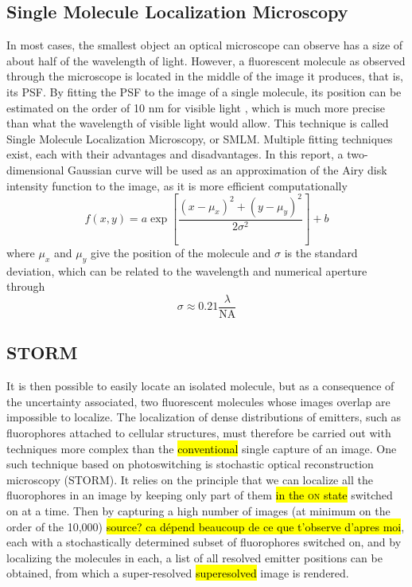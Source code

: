 \subsection{Single Molecule Localization Microscopy} \label{sec:SMLM}
In most cases, the smallest object an optical microscope can observe has a size of about half of the wavelength of light. However, a fluorescent molecule as observed through the microscope is located in the middle of the image it produces, that is, its PSF. By fitting the PSF to the image of a single molecule, its position can be estimated on the order of 10 nm for visible light \cite{douglass_notice_2023}, which is much more precise than what the wavelength of visible light would allow. This technique is called Single Molecule Localization Microscopy, or SMLM. Multiple fitting techniques exist, each with their advantages and disadvantages. In this report, a two-dimensional Gaussian curve will be used as an approximation of the Airy disk intensity function to the image, as it is more efficient \mbox{computationally \cite{douglass_notice_2023}}
\begin{equation}
    f(x, y) = a \exp \left[ \frac{(x-\mu_x)^2 + (y-\mu_y)^2}{2 \sigma^2} \right] + b
\end{equation}
where $\mu_x$ and $\mu_y$ give the position of the molecule and $\sigma$ is the standard deviation, which can be related to the wavelength and numerical aperture through \cite{zhang-appliedoptics-2007}
\begin{equation}
    \sigma \approx 0.21 \frac{\lambda}{\textrm{NA}}
    \label{eq:PSF_width_gaussian}
\end{equation}


\subsection{STORM} \label{sec:STORM}
It is then possible to easily locate an isolated molecule, but as a consequence of the uncertainty associated, two fluorescent molecules whose images overlap are impossible to localize.
The localization of dense distributions of emitters, such as fluorophores attached to cellular structures, must therefore be carried out with techniques more complex than the \hl{conventional} single capture of an image.
One such technique based on photoswitching is stochastic optical reconstruction microscopy (STORM).
It relies on the principle that we can localize all the fluorophores in an image by keeping only part of them \hl{in the \textsc{on} state} switched on at a time.
Then by capturing a high number of images (at minimum on the order of the 10,000) \hl{source? ca dépend beaucoup de ce que t'observe d'apres moi}, each with a stochastically determined subset of fluorophores switched on, and by localizing the molecules in each, a list of all resolved emitter positions can be obtained, from which a super-resolved \hl{superesolved} image is rendered.

